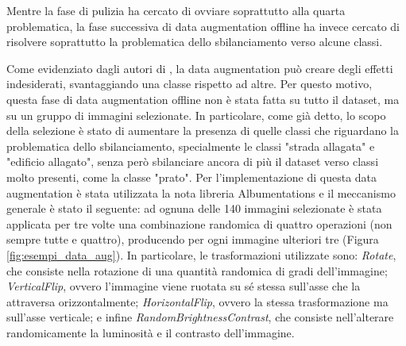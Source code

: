 Mentre la fase di pulizia ha cercato di ovviare soprattutto alla quarta problematica, la fase successiva di data augmentation offline ha invece cercato di risolvere soprattutto la problematica dello sbilanciamento verso alcune classi.

Come evidenziato dagli autori di \cite{data_aug_effects}, la data augmentation può creare degli effetti indesiderati, svantaggiando una classe rispetto ad altre. Per questo motivo, questa fase di data augmentation offline non è stata fatta su tutto il dataset, ma su un gruppo di immagini selezionate. In particolare, come già detto, lo scopo della selezione è stato di aumentare la presenza di quelle classi che riguardano la problematica dello sbilanciamento, specialmente le classi "strada allagata" e "edificio allagato", senza però sbilanciare ancora di più il dataset verso classi molto presenti, come la classe "prato". 
Per l'implementazione di questa data augmentation è stata utilizzata la nota libreria Albumentations \cite{albumentations} e il meccanismo generale è stato il seguente: ad ognuna delle 140 immagini selezionate è stata applicata per tre volte una combinazione randomica di quattro operazioni (non sempre tutte e quattro), producendo  per ogni immagine ulteriori tre (Figura \ref{fig:esempi_data_aug}). In particolare, le trasformazioni utilizzate sono: \textit{Rotate}, che consiste nella rotazione di una quantità randomica di gradi dell'immagine; \textit{VerticalFlip}, ovvero l'immagine viene ruotata su sé stessa sull'asse che la attraversa orizzontalmente; \textit{HorizontalFlip}, ovvero la stessa trasformazione ma sull'asse verticale; e infine \textit{RandomBrightnessContrast}, che consiste nell'alterare randomicamente la luminosità e il contrasto dell'immagine.

